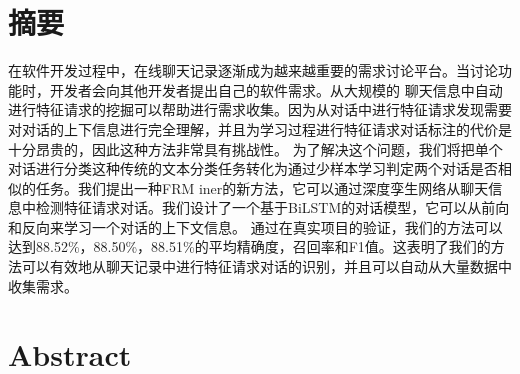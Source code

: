 \maketitle%
\MAKETITLE%
\makedeclaration%
\intobmk\chapter*{摘\quad 要}%
\setcounter{page}{1}%

在软件开发过程中，在线聊天记录逐渐成为越来越重要的需求讨论平台。当讨论功能时，开发者会向其他开发者提出自己的软件需求。从大规模的
聊天信息中自动进行特征请求的挖掘可以帮助进行需求收集。因为从对话中进行特征请求发现需要对对话的上下信息进行完全理解，并且为学习过程进行特征请求对话标注的代价是十分昂贵的，因此这种方法非常具有挑战性。
为了解决这个问题，我们将把单个对话进行分类这种传统的文本分类任务转化为通过少样本学习判定两个对话是否相似的任务。我们提出一种FRM iner的新方法，它可以通过深度孪生网络从聊天信息中检测特征请求对话。我们设计了一个基于BiLSTM的对话模型，它可以从前向和反向来学习一个对话的上下文信息。
通过在真实项目的验证，我们的方法可以达到88.52\%，88.50\%，88.51\%的平均精确度，召回率和F1值。这表明了我们的方法可以有效地从聊天记录中进行特征请求对话的识别，并且可以自动从大量数据中收集需求。

\intobmk\chapter*{Abstract}%

